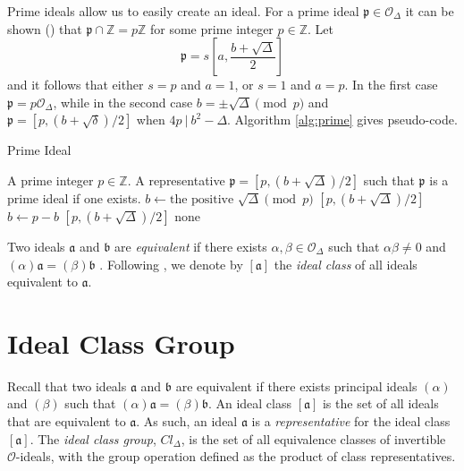 \documentclass{ucalgthes1}
\theoremstyle{definition}
\newcommand{\OO}{\mathcal{O}}
\newcommand{\ZZ}{\mathbb{Z}}
\begin{document}
Prime ideals allow us to easily create an ideal.  For a prime ideal $\mathfrak p \in \OO_\Delta$ it can be shown (\cite[p.19]{Jacobson1999}) that $\mathfrak p \cap \ZZ = p\ZZ$ for some prime integer $p \in \ZZ$. Let
\[
	\mathfrak p = s\left[a, \frac{b + \sqrt{\Delta}}{2}\right]
\]
and it follows that either $s=p$ and $a=1$, or $s=1$ and $a=p$.  In the first case $\mathfrak p = p\OO_\Delta$, while in the second case $b = \pm \sqrt{\Delta} \pmod p$ and $\mathfrak p = [p, (b + \sqrt{\delta})/2]$ when $4p ~|~ b^2 - \Delta$.  Algorithm \ref{alg:prime} gives pseudo-code.

\bigbreak
\begin{algorithm}[h]
\caption{Prime Ideal}
\label{alg:prime}
\begin{algorithmic}[1]
\REQUIRE A prime integer $p \in \ZZ$.
\ENSURE A representative $\mathfrak p = [p, (b+\sqrt\Delta)/2]$ such that $\mathfrak p$ is a prime ideal if one exists.
\STATE $b \gets \textrm{the positive } \sqrt\Delta \pmod p$
	\RETURN $[p, (b+\sqrt\Delta)/2]$
\ENDIF
\STATE $b \gets p-b$
	\RETURN $[p, (b+\sqrt\Delta)/2]$
\ENDIF
\RETURN none
\end{algorithmic}
\end{algorithm}

Two ideals $\mathfrak a$ and $\mathfrak b$ are \emph{equivalent} if there exists $\alpha, \beta \in \OO_\Delta$ such that $\alpha \beta \neq 0$ and $(\alpha)\mathfrak a = (\beta) \mathfrak b$ \cite[p.88]{Jacobson2009}. Following \cite[p.88]{Jacobson2009}, we denote by $[\mathfrak a]$ the \emph{ideal class} of all ideals equivalent to $\mathfrak a$. 


\bigbreak
\section{Ideal Class Group}

Recall that two ideals $\mathfrak a$ and $\mathfrak b$ are equivalent if there exists principal ideals $(\alpha)$ and $(\beta)$ such that $(\alpha)\mathfrak a = (\beta)\mathfrak b$.  An ideal class $[\mathfrak a]$ is the set of all ideals that are equivalent to $\mathfrak a$. As such, an ideal $\mathfrak a$ is a \emph{representative} for the ideal class $[\mathfrak a]$. The \emph{ideal class group}, $Cl_\Delta$, is the set of all equivalence classes of invertible $\OO$-ideals, with the group operation defined as the product of class representatives.
\end{document}
